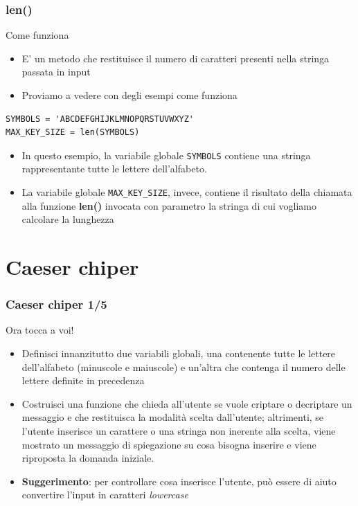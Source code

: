 \documentclass{beamer}
\begin{document}
\begin{frame}[fragile]
\frametitle{len()}
\begin{block}{Come funziona}
	\begin{itemize}
		\item E' un metodo che restituisce il numero di caratteri presenti nella stringa passata in input
		\item Proviamo a vedere con degli esempi come funziona
	\end{itemize}

	\begin{lstlisting}
SYMBOLS = 'ABCDEFGHIJKLMNOPQRSTUVWXYZ'
MAX_KEY_SIZE = len(SYMBOLS)
	\end{lstlisting}	
	\begin{itemize}
		\item In questo esempio, la variabile globale \texttt{SYMBOLS} contiene una stringa rappresentante tutte le lettere dell'alfabeto.
		\item La variabile globale \texttt{MAX\_KEY\_SIZE}, invece, contiene il risultato della chiamata alla funzione \textbf{len()} invocata con parametro la stringa di cui vogliamo calcolare la lunghezza
	\end{itemize}
\end{block}
\end{frame}

\section{Caeser chiper}

\begin{frame}[fragile]
\frametitle{Caeser chiper 1/5}
\begin{block}{Ora tocca a voi!}
	\begin{itemize}
		\item Definisci innanzitutto due variabili globali, una contenente tutte le lettere dell'alfabeto (minuscole e maiuscole) e un'altra che contenga il numero delle lettere definite in precedenza
		\item Costruisci una funzione che chieda all'utente se vuole criptare o decriptare un messaggio e che restituisca la modalità scelta dall'utente; altrimenti, se l'utente inserisce un carattere o una stringa non inerente alla scelta, viene mostrato un messaggio di spiegazione su cosa bisogna inserire e viene riproposta la domanda iniziale.
		\item \textbf{Suggerimento}: per controllare cosa inserisce l'utente, può essere di aiuto convertire l'input in caratteri \textit{lowercase} 
	\end{itemize}
\end{block}
\end{frame}
\end{document}
